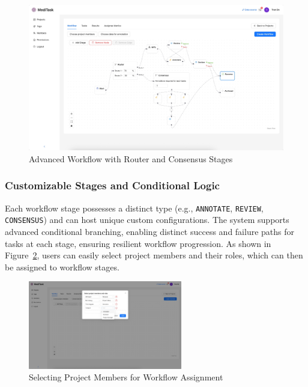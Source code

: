 \begin{figure}[h!]
    \centering
    \includegraphics[width=1\textwidth]{content/resources/features/complex workflow.png}
    \caption{Advanced Workflow with Router and Consensus Stages}
    \label{fig:workflow-editor-advanced}
\end{figure}

\subsubsection{Customizable Stages and Conditional Logic}
Each workflow stage possesses a distinct type (e.g., \texttt{ANNOTATE}, \texttt{REVIEW}, \texttt{CONSENSUS}) and can host unique custom configurations. The system supports advanced conditional branching, enabling distinct success and failure paths for tasks at each stage, ensuring resilient workflow progression. As shown in Figure~\ref{fig:workflow-select-members}, users can easily select project members and their roles, which can then be assigned to workflow stages.

\begin{figure}[h!]
    \centering
    \includegraphics[width=0.6\textwidth]{content/resources/features/choose members.png}
    \caption{Selecting Project Members for Workflow Assignment}
    \label{fig:workflow-select-members}
\end{figure}

